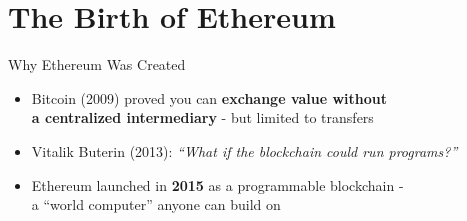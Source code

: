 \documentclass[aspectratio=169, 11pt]{beamer}
\begin{document}
\section{The Birth of Ethereum}

\begin{frame}{Why Ethereum Was Created}
  \begin{itemize}
    \setlength{\itemsep}{12pt}
    \item Bitcoin (2009) proved you can \textbf{exchange value without}\\
          \textbf{a centralized intermediary} - but limited to transfers
    \item Vitalik Buterin (2013): \emph{``What if the blockchain could run programs?''}
    \item Ethereum launched in \textbf{2015} as a \textcolor{ap3orange}{programmable blockchain}  - \\
          a ``world computer'' anyone can build on
  \end{itemize}

\end{frame}
\end{document}
